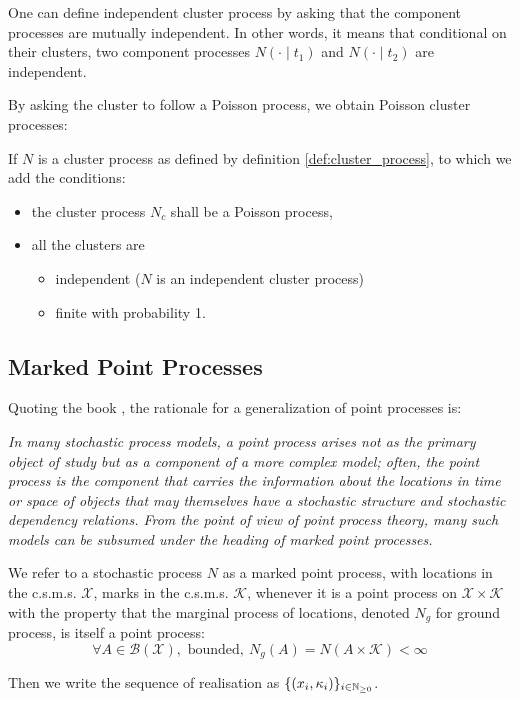 \documentclass[11pt]{book}
\newcommand{\sequence}[1]{\{ #1 \}_{ i \in \N} }
\begin{document}
\begin{remarque}
One can define independent cluster process by asking that the component processes are mutually independent. In other words, it means that conditional on their clusters, two component processes $N(\cdot \mid t_1)$ and $N(\cdot \mid t_2)$ are independent.
\end{remarque}


By asking the cluster to follow a Poisson process, we obtain Poisson cluster processes:

\begin{definition}
\label{def:poisson_cluster}
If $N$ is a cluster process as defined by definition \ref{def:cluster_process}, to which we add the conditions:

\begin{itemize}
\setlength{\itemindent}{2.5 cm}
\item the cluster process $N_c$ shall be a Poisson process,
\item all the clusters are 
\begin{itemize}
\setlength{\itemindent}{3 cm}
\item independent ($N$ is an independent cluster process)
\item finite with probability 1.
\end{itemize}
\end{itemize}

\end{definition}




\newpage
\subsection{Marked Point Processes}
Quoting the book \cite{daley}, the rationale for a generalization of point processes is:

\textit{In many stochastic process models, a point process arises not as the primary object of study but as a component of a more complex model; often, the point process is the component that carries the information about the locations in time or space of objects that may themselves have a stochastic structure and stochastic dependency relations. From the point of view of point process theory, many such models can be subsumed under the heading of marked point processes.}

\begin{definition}
We refer to a stochastic process $N$ as a marked point process, with locations in the c.s.m.s. $\mathcal X$, marks in the c.s.m.s. $\mathcal K$, whenever it is a point process on $\mathcal X \times \mathcal K$ with the property that the marginal process of locations, denoted $N_g$ for ground process, is itself a point process:
\begin{equation} 
\forall A \in \mathcal B ( \mathcal X ), \text{ bounded}, \ N_g ( A ) = N( A \times \mathcal K ) < \infty
\end{equation}

Then we write the sequence of realisation as $ \sequence{ (x_i,\kappa_i) } $.
\end{definition}
\end{document}
